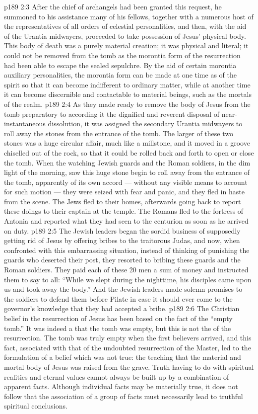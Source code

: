 \vs p189 2:3 After the chief of archangels had been granted this request, he summoned to his assistance many of his fellows, together with a numerous host of the representatives of all orders of celestial personalities, and then, with the aid of the Urantia midwayers, proceeded to take possession of Jesus’ physical body. This body of death was a purely material creation; it was physical and literal; it could not be removed from the tomb as the morontia form of the resurrection had been able to escape the sealed sepulchre. By the aid of certain morontia auxiliary personalities, the morontia form can be made at one time as of the spirit so that it can become indifferent to ordinary matter, while at another time it can become discernible and contactable to material beings, such as the mortals of the realm.
\vs p189 2:4 As they made ready to remove the body of Jesus from the tomb preparatory to according it the dignified and reverent disposal of near\hyp{}instantaneous dissolution, it was assigned the secondary Urantia midwayers to roll away the stones from the entrance of the tomb. The larger of these two stones was a huge circular affair, much like a millstone, and it moved in a groove chiselled out of the rock, so that it could be rolled back and forth to open or close the tomb. When the watching Jewish guards and the Roman soldiers, in the dim light of the morning, saw this huge stone begin to roll away from the entrance of the tomb, apparently of its own accord --- without any visible means to account for such motion --- they were seized with fear and panic, and they fled in haste from the scene. The Jews fled to their homes, afterwards going back to report these doings to their captain at the temple. The Romans fled to the fortress of Antonia and reported what they had seen to the centurion as soon as he arrived on duty.
\vs p189 2:5 The Jewish leaders began the sordid business of supposedly getting rid of Jesus by offering bribes to the traitorous Judas, and now, when confronted with this embarrassing situation, instead of thinking of punishing the guards who deserted their post, they resorted to bribing these guards and the Roman soldiers. They paid each of these 20 men a sum of money and instructed them to say to all: “While we slept during the nighttime, his disciples came upon us and took away the body.” And the Jewish leaders made solemn promises to the soldiers to defend them before Pilate in case it should ever come to the governor’s knowledge that they had accepted a bribe.
\vs p189 2:6 \pc The Christian belief in the resurrection of Jesus has been based on the fact of the “empty tomb.” It was indeed a  that the tomb was empty, but this is not the  of the resurrection. The tomb was truly empty when the first believers arrived, and this fact, associated with that of the undoubted resurrection of the Master, led to the formulation of a belief which was not true: the teaching that the material and mortal body of Jesus was raised from the grave. Truth having to do with spiritual realities and eternal values cannot always be built up by a combination of apparent facts. Although individual facts may be materially true, it does not follow that the association of a group of facts must necessarily lead to truthful spiritual conclusions.
